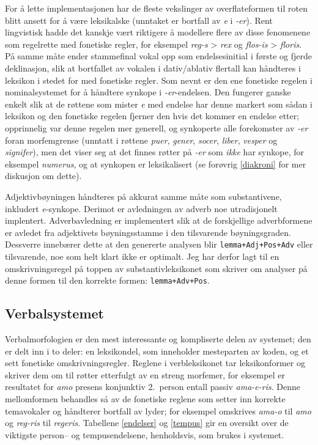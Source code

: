 \documentclass{article}
\newcommand\note[1]{\marginpar{\raggedright\tiny#1}}
\let\form\texttt
\let\w\emph
\begin{document}
For \aa{} lette implementasjonen har de fleste vekslinger av overflateformen
til roten blitt ansett for \aa{} v\ae{}re leksikalske (unntaket er bortfall av
\w{e} i \w{-er}). Rent lingvistisk hadde det kanskje v\ae{}rt riktigere \aa{}
modellere flere av disse fenomenene som regelrette med fonetiske regler, for
eksempel \w{reg-s} > \w{rex} og \w{flos-is} > \w{floris}. P\aa{} samme
m\aa{}te ender stammefinal vokal opp som endelsesinitial i f\o{}rste og fjerde
deklinasjon, slik at bortfallet av vokalen i dativ/ablativ flertall kan
h\aa{}ndteres i leksikon i stedet for med fonetiske regler. Som nevnt er den
ene fonetiske regelen i nominalsystemet for \aa{} h\aa{}ndtere
synkope\note{Synkope er riktig, no?} i \w{-er}-endelsen. Den fungerer ganske
enkelt slik at de r\o{}ttene som mister \w{e} med endelse har denne markert
som s\aa{}dan i leksikon og den fonetiske regelen fjerner den hvis det kommer
en endelse etter; opprinnelig var denne regelen mer generell, og synkoperte
alle forekomster av \w{-er} foran morfemgrense (unntatt i r\o{}ttene \w{puer},
\w{gener}, \w{socer}, \w{liber}, \w{vesper} og \w{signifer}), men det viser
seg at det finnes r\o{}tter p\aa{} \w{-er} som \emph{ikke} har synkope, for
eksempel \w{numerus}, og at synkopen er leksikalisert (se for\o{}vrig
\ref{diakroni} for mer diskusjon om dette).

Adjektivb\o{}yningen h\aa{}ndteres p\aa{} akkurat samme m\aa{}te som
substantivene, inkludert \w{e}-synkope. Derimot er avledningen av adverb noe
utradisjonelt implentert. Adverbavledning er implementert slik at de
forskjellige adverbformene er avledet fra adjektivets b\o{}yningsstamme i den
tilsvarende b\o{}yningsgraden. Dessverre inneb\ae{}rer dette at den genererte
analysen blir \form{lemma+Adj+Pos+Adv} eller tilsvarende, noe som helt klart
ikke er optimalt. Jeg har derfor lagt til en omskrivningsregel p\aa{} toppen
av substantivleksikonet som skriver om analyser p\aa{} denne formen til den
korrekte formen: \form{lemma+Adv+Pos}.

\subsection{Verbalsystemet}
\label{konjugasjon}
Verbalmorfologien er den mest interessante og kompliserte delen av systemet;
den er delt inn i to deler: en leksikondel, som inneholder mesteparten av
koden, og et sett fonetiske omskrivningsregler. Reglene i verbleksikonet tar
leksikonformer og skriver dem om til r\o{}tter etterfulgt av en streng
morfemer, for eksempel er resultatet for \w{amo} presens konjunktiv 2.~person
entall passiv \w{ama-e-ris}. Denne mellomformen behandles s\aa{} av de
fonetiske reglene som setter inn korrekte temavokaler og h\aa{}ndterer
bortfall av lyder; for eksempel omskrives \w{ama-o} til \w{amo} og \w{reg-ris}
til \w{regeris}. Tabellene \ref{endelser} og \ref{tempus} gir en oversikt over
de viktigste person-- og tempusendelsene, henholdsvis, som brukes i systemet.
\end{document}

